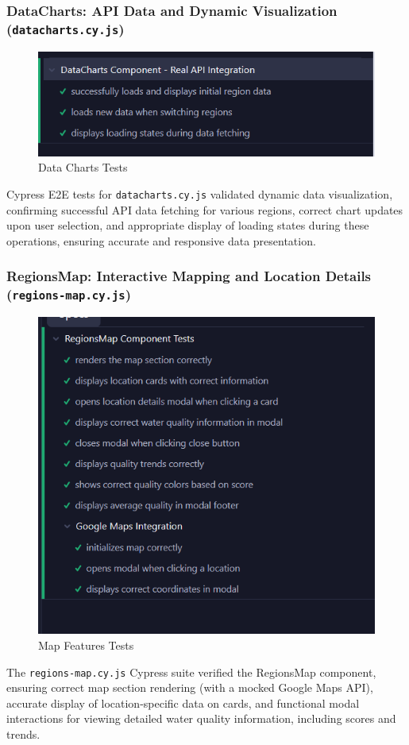 \subsubsection{DataCharts: API Data and Dynamic Visualization (\texttt{datacharts.cy.js})}
\label{sssec:datacharts_test_summary_summary}
\begin{figure}[H]
    \centering
    \includegraphics[width=0.75\linewidth]{Figures/test2.png}
    \caption{Data Charts Tests}
    \label{fig:enter-label}
\end{figure}
Cypress E2E tests for \texttt{datacharts.cy.js} validated dynamic data visualization, confirming successful API data fetching for various regions, correct chart updates upon user selection, and appropriate display of loading states during these operations, ensuring accurate and responsive data presentation.

\subsubsection{RegionsMap: Interactive Mapping and Location Details (\texttt{regions-map.cy.js})}
\begin{figure}[H]
    \centering
    \includegraphics[width=0.5\linewidth]{Figures/test3.png}
    \caption{Map Features Tests}
    \label{fig:enter-label}
\end{figure}
\label{sssec:regionsmap_test_summary_summary}
The \texttt{regions-map.cy.js} Cypress suite verified the RegionsMap component, ensuring correct map section rendering (with a mocked Google Maps API), accurate display of location-specific data on cards, and functional modal interactions for viewing detailed water quality information, including scores and trends.

